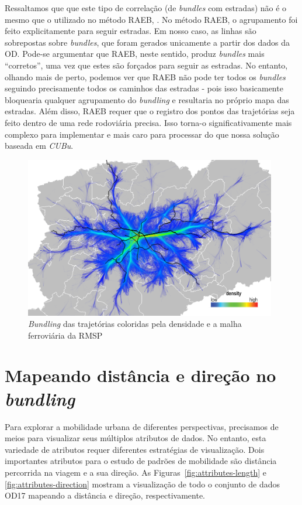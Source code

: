 Ressaltamos que que este tipo de correlação (de \emph{bundles} com estradas) não
é o mesmo que o utilizado no método RAEB, \cite{zeng:19}. No método RAEB, o
agrupamento foi feito explicitamente para seguir estradas. Em nosso caso, as
linhas são sobrepostas sobre \emph{bundles}, que foram gerados unicamente a partir dos
dados da OD. Pode-se argumentar que RAEB, neste sentido, produz \emph{bundles}
mais ``corretos'', uma vez que estes são forçados para seguir as estradas. No
entanto, olhando mais de perto, podemos ver que RAEB não pode ter todos os
\emph{bundles} seguindo precisamente todos os caminhos das estradas - pois isso
basicamente bloquearia qualquer agrupamento do \emph{bundling} e resultaria no próprio
mapa das estradas. Além disso, RAEB requer que o registro dos pontos das trajetórias
seja feito dentro de uma rede rodoviária precisa. Isso torna-o
significativamente mais complexo para implementar e mais caro para processar do
que nossa solução baseada em \emph{CUBu}.

\begin{figure}[!htb]
  \centering
  \captionsetup{justification=centering}
  \includegraphics[width=0.98\textwidth]{../figuras/rail-lines.png}
    \caption{\emph{Bundling} das trajetórias coloridas pela densidade e a malha ferroviária da RMSP}
  \label{fig:rails}  
\end{figure}

\section{Mapeando distância e direção no \emph{bundling}}
\label{sec:length-direction}

Para explorar a mobilidade urbana de diferentes perspectivas, precisamos de
meios para visualizar seus múltiplos atributos de dados. No entanto, esta
variedade de atributos requer diferentes estratégias de visualização. Dois
importantes atributos para o estudo de padrões de mobilidade são distância
percorrida na viagem e a sua direção. As Figuras~\ref{fig:attributes-length} e
\ref{fig:attributes-direction} mostram a visualização de todo o conjunto de
dados OD17 mapeando a distância e direção, respectivamente.

